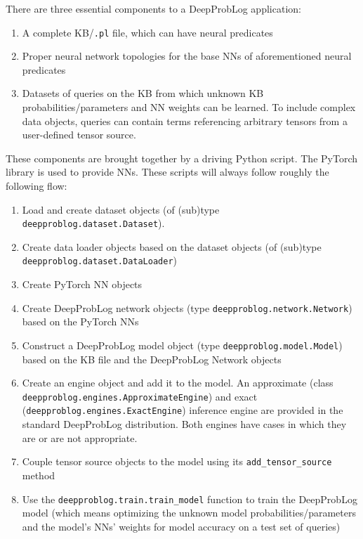 There are three essential components to a DeepProbLog application:
\begin{enumerate}
  \item A complete KB/\texttt{.pl} file, which can have neural predicates
  \item Proper neural network topologies for the base NNs of aforementioned neural predicates
  \item Datasets of queries on the KB from which unknown KB probabilities/parameters and NN weights can be learned. To include complex data objects, queries can contain terms referencing arbitrary tensors from a user-defined tensor source.
\end{enumerate}
These components are brought together by a driving Python script. The PyTorch library is used to provide NNs. These scripts will always follow roughly the following flow:
\begin{enumerate}
  \item Load and create dataset objects (of (sub)type \texttt{deepproblog.dataset.Dataset}).
  \item Create data loader objects based on the dataset objects (of (sub)type \texttt{deepproblog.dataset.DataLoader})
  \item Create PyTorch NN objects
  \item Create DeepProbLog network objects (type \texttt{deepproblog.network.Network}) based on the PyTorch NNs
  \item Construct a DeepProbLog model object (type \texttt{deepproblog.model.Model}) based on the KB file and the DeepProbLog Network objects
  \item Create an engine object and add it to the model. An approximate (class \texttt{deepproblog.engines.ApproximateEngine}) and exact (\texttt{deepproblog.engines.ExactEngine}) inference engine are provided in the standard DeepProbLog distribution. Both engines have cases in which they are or are not appropriate.
  \item Couple tensor source objects to the model using its \texttt{add\_tensor\_source} method
  \item Use the \texttt{deepproblog.train.train\_model} function to train the DeepProbLog model (which means optimizing the unknown model probabilities/parameters and the model's NNs' weights for model accuracy on a test set of queries)
\end{enumerate}

